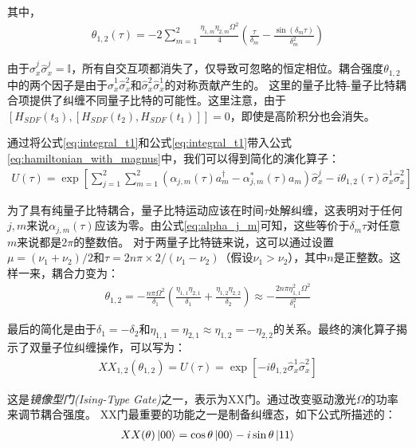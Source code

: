 其中，
\begin{align}
    \theta_{1,2}(\tau)=-2\sum_{m=1}^{2}\frac{\eta_{1,m}\eta_{2,m}\Omega^2}{4}\left(\frac{\tau}{\delta_m}-\frac{\sin(\delta_m\tau)}{\delta_m^2}\right)
\end{align}

由于$\hat{\sigma}_x^j\hat{\sigma}_x^j=\mathbb{I}$，所有自交互项都消失了，仅导致可忽略的恒定相位。耦合强度$\theta_{1,2}$中的两个因子是由于$\hat{\sigma}_x^1\hat{\sigma}_x^2$和$\hat{\sigma}_x^2\hat{\sigma}_x^1$的对称贡献产生的。
这里的量子比特-量子比特耦合项提供了纠缠不同量子比特的可能性。这里注意，由于$[H_{SDF}(t_3),[H_{SDF}(t_2),H_{SDF}(t_1)]]=0$，即使是高阶积分也会消失。

通过将公式\eqref{eq:integral_t1}和公式\eqref{eq:integral_t1}带入公式\eqref{eq:hamiltonian_with_magnus}中，我们可以得到简化的演化算子：
\begin{align}
    U(\tau)=\exp\left[\sum_{j=1}^{2}\sum_{m=1}^{2}\left(\alpha_{j,m}(\tau)a_m^\dagger-\alpha_{j,m}^*(\tau)a_m\right)\hat{\sigma}_x^j-i\theta_{1,2}(\tau)\hat{\sigma}_x^1\hat{\sigma}_x^2\right]
\end{align}

为了具有纯量子比特耦合，量子比特运动应该在时间$\tau$处解纠缠，这表明对于任何$j,m$来说$\alpha_{j,m}(\tau)$应该为零。由公式\eqref{eq:alpha_j_m}可知，这些等价于$\delta_m\tau$对任意$m$来说都是$2\pi$的整数倍。
对于两量子比特链来说，这可以通过设置$\mu=(\nu_1+\nu_2)/2$和$\tau=2n\pi\times2/(\nu_1-\nu_2)$（假设$\nu_1>\nu_2$），其中$n$是正整数。这样一来，耦合力变为：
\begin{align}
    \theta_{1,2}=-\frac{n\pi\Omega^2}{\delta_1}\left(\frac{\eta_{1,1}\eta_{2,1}}{\delta_1}+\frac{\eta_{1,2}\eta_{2,2}}{\delta_2}\right)\approx-\frac{2n\pi\eta_{1,1}^2\Omega^2}{\delta_1^2}
\end{align}

最后的简化是由于$\delta_1=-\delta_2$和$\eta_{1,1}=\eta_{2,1}\approx\eta_{1,2}=-\eta_{2,2}$的关系。最终的演化算子揭示了双量子位纠缠操作，可以写为：
\begin{align}
    XX_{1,2}(\theta_{1,2})=U(\tau)=\exp[-i\theta_{1,2}\hat{\sigma}_x^1\hat{\sigma}_x^2]
\end{align}

这是\emph{镜像型门(Ising-Type Gate)}之一，表示为XX门。通过改变驱动激光$\Omega$的功率来调节耦合强度。
XX门最重要的功能之一是制备纠缠态，如下公式所描述的：
\begin{align}
    XX(\theta)\ket{00}=\cos\theta\ket{00}-i\sin\theta\ket{11}
\end{align}

